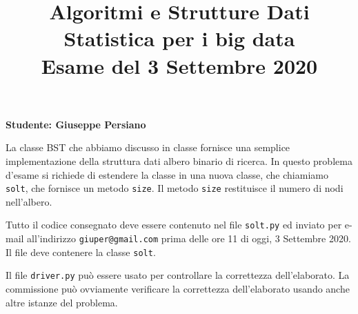 \documentclass{amsart}
\begin{document}
\title{Algoritmi e Strutture Dati\\
Statistica per i big data\\
Esame del 3 Settembre 2020
}


\newcommand{\NomeStudente}{Giuseppe Persiano}
\newcommand{\nomeClasse}{solt}


\maketitle

\hfill{{\bf Studente: \NomeStudente}}

\smallskip
La classe BST che abbiamo discusso in classe fornisce una semplice 
implementazione della struttura dati albero binario di ricerca.
In questo problema d'esame si richiede di estendere la classe {}
in una nuova classe, che chiamiamo {\tt {\nomeClasse}},
che fornisce un metodo 
{\tt size}. Il metodo {\tt size} restituisce il numero di nodi nell'albero.


\medskip{}
Tutto il codice consegnato deve essere contenuto nel file
{\tt \nomeClasse .py} ed inviato per e-mail all'indirizzo
{\tt giuper@gmail.com} prima delle ore 11 di oggi, 3 Settembre 2020.
Il file deve contenere la classe {\tt \nomeClasse}.

Il file {\tt driver.py} pu\`o essere usato per controllare la correttezza
dell'elaborato. 
La commissione pu\`o ovviamente verificare la correttezza dell'elaborato
usando anche altre istanze del problema.
\end{document}
